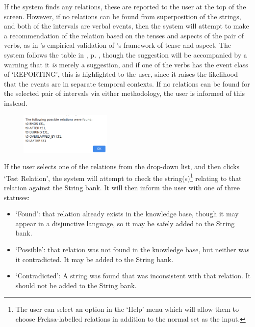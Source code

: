 \documentclass[a4paper,12pt,leqno]{article}
\begin{document}
If the system finds any relations, these are reported to the user at the top of the screen. However, if no relations can be found from superposition of the strings, and both of the intervals are verbal events, then the system will attempt to make a recommendation of the relation based on the tenses and aspects of the pair of verbs, as in \citet{Derczynski2013}'s empirical validation of \citet{reichenbach1947elements}'s framework of tense and aspect. The system follows the table in , p. \pageref{fig:tense-aspect-freksa}, though the suggestion will be accompanied by a warning that it \textit{is} merely a suggestion, and if one of the verbs has the event class of `REPORTING', this is highlighted to the user, since it raises the likelihood that the events are in separate temporal contexts.  If no relations can be found for the selected pair of intervals via either methodology, the user is informed of this instead.
\begin{center}
	\begin{figure}[h!]
		\centering
		\includegraphics[width=0.4\textwidth]{images/START-try-2.png}
	\end{figure}
\end{center}
If the user selects one of the relations from the drop-down list, and then clicks `Test Relation', the system will attempt to check the string(s)\footnote{The user can select an option in the `Help' menu which will allow them to choose Freksa-labelled relations in addition to the normal set as the input.} relating to that relation against the String bank. It will then inform the user with one of three statuses:
\begin{itemize}
	\item `Found': that relation already exists in the knowledge base, though it may appear in a disjunctive language, so it may be safely added to the String bank.
	\item `Possible': that relation was not found in the knowledge base, but neither was it contradicted. It may be added to the String bank.
	\item `Contradicted': A string was found that was inconsistent with that relation. It should not be added to the String bank.
\end{itemize}
\end{document}
